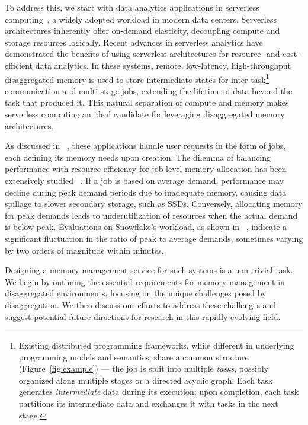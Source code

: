 To address this, we start with data analytics applications in serverless computing~\cite{starling, locus, pocket, flint, sparkonlambda, cirrus, excamera, pywren, numpywren, gg, athena, aurora, azuresqldw, cloudburst, snowset, caerus}, a widely adopted workload in modern data centers. Serverless architectures inherently offer on-demand elasticity, decoupling compute and storage resources logically. Recent advances in serverless analytics have demonstrated the benefits of using serverless architectures for resource- and cost-efficient data analytics. In these systems, remote, low-latency, high-throughput disaggregated memory is used to store intermediate states for inter-task{\footnote{Existing distributed programming frameworks, while different in underlying programming models and semantics, share a common structure (Figure~\ref{fig:example}) --- the job is split into multiple {\em tasks}, possibly organized along multiple stages or a directed acyclic graph. Each task generates {\em intermediate} data during its execution; upon completion, each task partitions its intermediate data and exchanges it with tasks in the next stage.}} communication and multi-stage jobs, extending the lifetime of data beyond the task that produced it. This natural separation of compute and memory makes serverless computing an ideal candidate for leveraging disaggregated memory architectures.

As discussed in ~\cite{starling, shuffling, pocket, cirrus}, these applications handle user requests in the form of jobs, each defining its memory needs upon creation. The dilemma of balancing performance with resource efficiency for job-level memory allocation has been extensively studied ~\cite{elasticquery, qoop}. If a job is based on average demand, performance may decline during peak demand periods due to inadequate memory, causing data spillage to slower secondary storage, such as SSDs. Conversely, allocating memory for peak demands leads to underutilization of resources when the actual demand is below peak. Evaluations on Snowflake's workload, as shown in ~\cite{elasticquery}, indicate a significant fluctuation in the ratio of peak to average demands, sometimes varying by two orders of magnitude within minutes.

Designing a memory management service for such systems is a non-trivial task. We begin by outlining the essential requirements for memory management in disaggregated environments, focusing on the unique challenges posed by disaggregation. We then discuss our efforts to address these challenges and suggest potential future directions for research in this rapidly evolving field.

